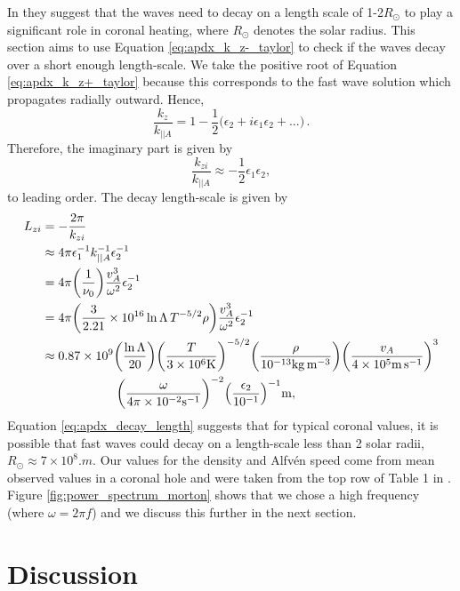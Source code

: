 In \citet{Withbroe1977,Parker1991} they suggest that the waves need to decay on a length scale of 1-2$R_\odot$ to play a significant role in coronal heating, where $R_\odot$ denotes the solar radius. This section aims to use Equation \eqref{eq:apdx_k_z-_taylor} to check if the waves decay over a short enough length-scale. We take the positive root of Equation \eqref{eq:apdx_k_z+_taylor} because this corresponds to the fast wave solution which propagates radially outward. Hence,
\begin{equation}
    \frac{k_z}{k_{||A}} = 1 - \frac{1}{2}\Big(\epsilon_2  + i\epsilon_1\epsilon_2 + ...\Big)\,.
\end{equation}
Therefore, the imaginary part is given by
\begin{equation}
    \frac{k_{zi}}{k_{||A}} \approx -\frac{1}{2}\epsilon_1\epsilon_2,
\end{equation}
to leading order.
The decay length-scale is given by
\begin{equation}
    \label{eq:apdx_decay_length}
    \begin{aligned}
    L_{zi} &= -\frac{2\pi}{k_{zi}} \\
    &\approx 4\pi\epsilon_1^{-1}k_{||A}^{-1}\epsilon_2^{-1} \\
    &= 4\pi\qty(\frac{1}{\nu_0})\frac{v_A^3}{\omega^2}\epsilon_2^{-1} \\
    &= 4\pi\qty(\frac{3}{2.21}\times10^{16}\ln\Lambda\, T^{-5/2}\rho)\frac{v_A^3}{\omega^2}\epsilon_2^{-1} \\
    &\approx 0.87\times10^9\qty(\frac{\ln \Lambda}{20})\qty(\frac{T}{3\times10^6\si{.K}})^{-5/2}\qty(\frac{\rho}{10^{-13}\si{.kg.m^{-3}}})\qty(\frac{v_A}{4\times10^5\si{.m.s^{-1}}})^3 \\
    &\qquad\qquad\qquad\qty(\frac{\omega}{4\pi\times10^{-2}\si{.s^{-1}}})^{-2}\qty(\frac{\epsilon_2}{10^{-1}})^{-1}\si{.m},
    \end{aligned}
\end{equation}
Equation \eqref{eq:apdx_decay_length} suggests that for typical coronal values, it is possible that fast waves could decay on a length-scale less than 2 solar radii, $R_\odot\approx 7\times10^8\si{.m}$. Our values for the density and Alfv\'en speed come from mean observed values in a coronal hole and were taken from the top row of Table 1 in \citet{Morton2016}. Figure \ref{fig:power_spectrum_morton} shows that we chose a high frequency (where $\omega= 2\pi f$) and we discuss this further in the next section.

\section{Discussion}

